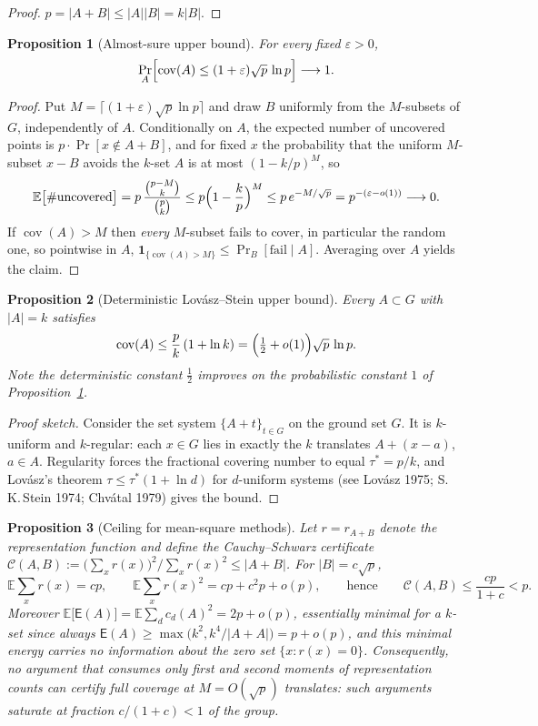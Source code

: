 \documentclass[11pt]{article}
\newtheorem{proposition}{Proposition}
\theoremstyle{definition}
\newcommand{\E}{\mathbb{E}}
\newcommand{\Prob}{\Pr}
\newcommand{\cov}{\operatorname{cov}}
\begin{document}
\begin{proof}
$p=|A+B|\le|A||B|=k|B|$.
\end{proof}

\begin{proposition}[Almost-sure upper bound]\label{prop:as}
For every fixed $\varepsilon>0$,
\[
\Prob_A\Bigl[\cov(A)\le(1+\varepsilon)\sqrt p\,\ln p\Bigr]\longrightarrow1 .
\]
\end{proposition}

\begin{proof}
Put $M=\lceil(1+\varepsilon)\sqrt p\ln p\rceil$ and draw $B$ uniformly from
the $M$-subsets of $G$, independently of $A$. Conditionally on $A$, the
expected number of uncovered points is
$p\cdot\Prob[x\notin A+B]$, and for fixed $x$ the probability that the uniform
$M$-subset $x-B$ avoids the $k$-set $A$ is at most $(1-k/p)^M$, so
\[
\E\bigl[\#\text{uncovered}\bigr]
=p\,\frac{\binom{p-M}{k}}{\binom pk}
\le p\Bigl(1-\frac kp\Bigr)^{M}
\le p\,e^{-M/\sqrt p}
=p^{-(\varepsilon-o(1))}\longrightarrow0 .
\]
If $\cov(A)>M$ then \emph{every} $M$-subset fails to cover, in particular the
random one, so pointwise in $A$,
$\mathbf 1_{\{\cov(A)>M\}}\le\Prob_B[\text{fail}\mid A]$. Averaging over $A$
yields the claim.
\end{proof}

\begin{proposition}[Deterministic Lov\'asz--Stein upper bound]\label{prop:lovasz}
Every $A\subset G$ with $|A|=k$ satisfies
\[
\cov(A)\le\frac pk\,(1+\ln k)=\Bigl(\tfrac12+o(1)\Bigr)\sqrt p\,\ln p .
\]
Note the deterministic constant $\tfrac12$ improves on the probabilistic
constant $1$ of Proposition~\ref{prop:as}.
\end{proposition}

\begin{proof}[Proof sketch]
Consider the set system $\{A+t\}_{t\in G}$ on the ground set $G$. It is
$k$-uniform and $k$-regular: each $x\in G$ lies in exactly the $k$ translates
$A+(x-a)$, $a\in A$. Regularity forces the fractional covering number to equal
$\tau^\ast=p/k$, and Lov\'asz's theorem
$\tau\le\tau^\ast(1+\ln d)$ for $d$-uniform systems (see Lov\'asz 1975;
S.\,K.\,Stein 1974; Chv\'atal 1979) gives the bound.
\end{proof}

\begin{proposition}[Ceiling for mean-square methods]\label{prop:energy}
Let $r=r_{A+B}$ denote the representation function and define the
Cauchy--Schwarz certificate
$\mathcal C(A,B):=\bigl(\sum_x r(x)\bigr)^{2}\big/\sum_x r(x)^{2}\le|A+B|$.
For $|B|=c\sqrt p$,
\[
\E\sum_x r(x)=cp,
\qquad
\E\sum_xr(x)^{2}=cp+c^{2}p+o(p),
\qquad\text{hence}\qquad
\mathcal C(A,B)\le\frac{cp}{1+c}<p .
\]
Moreover $\E\bigl[\mathsf E(A)\bigr]=\E\sum_dc_d(A)^{2}=2p+o(p)$, essentially
minimal for a $k$-set since always
$\mathsf E(A)\ge\max\bigl(k^{2},k^{4}/|A+A|\bigr)=p+o(p)$, and this minimal
energy carries no information about the zero set
$\{x:r(x)=0\}$. Consequently, no argument that consumes only first and second
moments of representation counts can certify full coverage at
$M=O(\sqrt p)$ translates: such arguments saturate at fraction
$c/(1+c)<1$ of the group.
\end{proposition}
\end{document}

